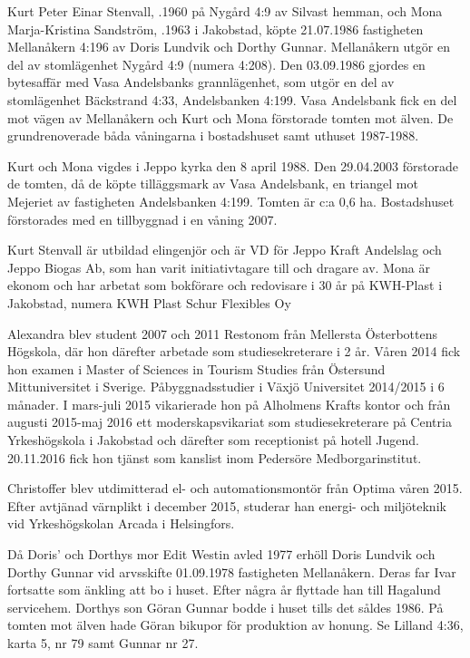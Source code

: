 
Kurt Peter Einar Stenvall, .1960 på Nygård 4:9 av Silvast hemman, och Mona Marja-Kristina Sandström, .1963 i 	Jakobstad, köpte 21.07.1986 fastigheten Mellanåkern 4:196 av Doris Lundvik och Dorthy Gunnar. Mellanåkern utgör en del av	stomlägenhet Nygård 4:9 (numera 4:208). Den 03.09.1986 gjordes en bytesaffär med Vasa Andelsbanks grannlägenhet, som utgör en del av stomlägenhet Bäckstrand 4:33, Andelsbanken 4:199. Vasa Andelsbank fick en del mot vägen av Mellanåkern och Kurt och Mona förstorade	tomten mot älven. De grundrenoverade båda våningarna i	bostadshuset samt uthuset 1987-1988.

Kurt och Mona vigdes i Jeppo	kyrka den 8 april 1988. Den 29.04.2003 förstorade de tomten, då de köpte tilläggsmark av Vasa Andelsbank, en triangel mot Mejeriet av fastigheten Andelsbanken 4:199. Tomten är c:a 0,6 ha.	Bostadshuset förstorades med en tillbyggnad i en våning 2007.

Kurt Stenvall är utbildad elingenjör och är VD för Jeppo Kraft Andelslag och Jeppo Biogas Ab, som han varit initiativtagare till och dragare av. Mona är ekonom och har arbetat som bokförare och redovisare i 30 år på	KWH-Plast i Jakobstad, numera KWH Plast Schur Flexibles Oy
\begin{jhchildren}
  \item {}
  \item {}
\end{jhchildren}
Alexandra blev student 2007 och 2011 Restonom från Mellersta Österbottens Högskola, där hon därefter arbetade som studiesekreterare i 2 år. Våren 2014 fick hon examen i Master of Sciences in Tourism Studies från Östersund Mittuniversitet i Sverige.  Påbyggnadsstudier i	Växjö Universitet 2014/2015 i 6 månader. I mars-juli 2015 vikarierade		hon på Alholmens Krafts kontor och från augusti 2015-maj 2016 ett moderskapsvikariat som studiesekreterare på Centria Yrkeshögskola i	Jakobstad och därefter som receptionist på hotell Jugend. 20.11.2016 fick hon tjänst som kanslist inom Pedersöre Medborgarinstitut.

Christoffer blev utdimitterad el- och automationsmontör från Optima våren 2015. Efter avtjänad värnplikt i december 2015, studerar han energi- och miljöteknik vid Yrkeshögskolan Arcada i Helsingfors.


Då Doris' och Dorthys mor Edit Westin avled 1977 erhöll Doris Lundvik och Dorthy Gunnar vid arvsskifte 01.09.1978 fastigheten Mellanåkern. Deras far Ivar fortsatte som änkling att bo i huset. Efter några år flyttade han till Hagalund servicehem. Dorthys son Göran Gunnar bodde i huset tills det såldes 1986. På tomten mot älven hade Göran bikupor för produktion av honung. Se Lilland 4:36, karta 5, nr 79 samt Gunnar nr 27.


